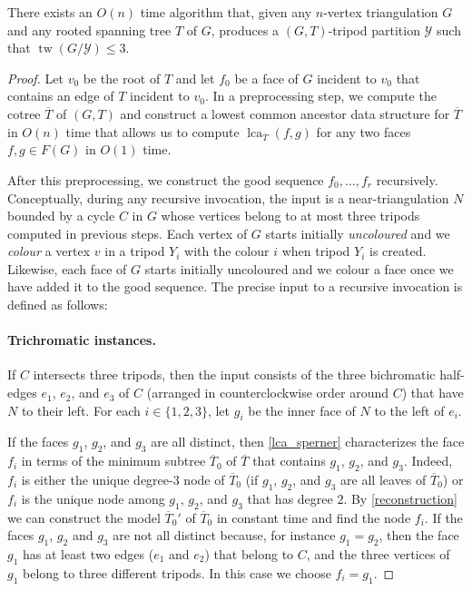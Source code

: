 \documentclass{patmorin}
\DeclareMathOperator{\tw}{tw}
\DeclareMathOperator{\lca}{lca}
\begin{document}
\begin{thm}\label{three_tree_algorithm}
  There exists an $O(n)$ time algorithm that, given any $n$-vertex triangulation $G$ and any rooted spanning tree $T$ of $G$, produces a $(G,T)$-tripod partition $\mathcal{Y}$ such that $\tw(G/\mathcal{Y})\le 3$.
\end{thm}

\begin{proof}
  Let $v_0$ be the root of $T$ and let $f_0$ be a face of $G$ incident to $v_0$ that contains an edge of $T$ incident to $v_0$.  In a preprocessing step, we compute the cotree $\overline{T}$ of $(G,T)$ and construct a lowest common ancestor data structure for $\overline{T}$ in $O(n)$ time that allows us to compute $\lca_{\overline{T}}(f,g)$ for any two faces $f,g\in F(G)$ in $O(1)$ time.

  After this preprocessing, we construct the good sequence $f_0,\ldots,f_{r}$ recursively. Conceptually, during any recursive invocation, the input is a near-triangulation $N$ bounded by a cycle $C$ in $G$ whose vertices belong to at most three tripods computed in previous steps.  Each vertex of $G$ starts initially \emph{uncoloured} and we \emph{colour} a vertex $v$ in a tripod $Y_i$ with the colour $i$ when tripod $Y_i$ is created.  Likewise, each face of $G$ starts initially uncoloured and we colour a face once we have added it to the good sequence.   The precise input to a recursive invocation is defined as follows:

  
\paragraph{Trichromatic instances.}
If $C$ intersects three tripods, then the input consists of the three bichromatic half-edges $e_1$, $e_2$, and $e_3$ of $C$ (arranged in counterclockwise order around $C$) that have $N$ to their left. 
For each $i\in\{1,2,3\}$, let $g_i$ be the inner face of $N$ to the left of $e_i$.

If the faces $g_1$, $g_2$, and $g_3$ are all distinct, then 
\cref{lca_sperner} characterizes the face $f_i$ in terms of the minimum subtree $\overline{T}_0$ of $\overline{T}$ that contains $g_1$, $g_2$, and $g_3$.  Indeed, $f_i$ is either the unique degree-$3$ node of $\overline{T}_0$ (if $g_1$, $g_2$, and $g_3$ are all leaves of $\overline{T}_0$) or $f_i$ is the unique node among $g_1$, $g_2$, and $g_3$ that has degree $2$.  By \cref{reconstruction} we can construct the model $\overline{T}_0'$ of $\overline{T}_0$ in constant time and find the node $f_i$.  If the faces $g_1$, $g_2$ and $g_3$ are not all distinct because, for instance $g_1=g_2$, then the face $g_1$ has at least two edges ($e_1$ and $e_2$) that belong to $C$, and the three vertices of $g_1$ belong to three different tripods. In this case we choose $f_i=g_1$.


\end{proof}
\end{document}
